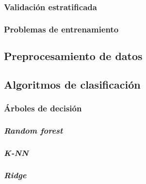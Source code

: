 \subsubsection{Validación estratificada}
\label{subsubsec:ev}



\subsubsection{Problemas de entrenamiento}
\label{subsubsec:problemas}

\subsection{Preprocesamiento de datos}



\subsubsection{}




\subsection{Algoritmos de clasificación}

\subsubsection{Árboles de decisión}
\label{subsubsec:arboles}


\subsubsection{\textit{Random forest}}
\label{subsubsec:randomforest}


\subsubsection{\textit{K-NN}}
\label{subsubsec:kneighbors}


\subsubsection{\textit{Ridge}}
\label{subsubsec:ridge}


